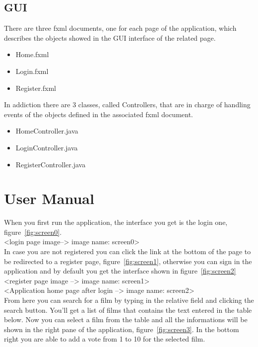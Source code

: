 \documentclass[a4paper, oneside]{article}
\begin{document}
\subsection{GUI}
There are three fxml documents, one for each page of the application, which describes the objects showed in the GUI interface of the related page.
\begin{itemize}
\item Home.fxml
\item Login.fxml
\item Register.fxml
\end{itemize}
In addiction there are 3 classes, called Controllers, that are in charge of handling events of the objects defined in the associated fxml document.
\begin{itemize}
\item HomeController.java
\item LoginController.java
\item RegisterController.java
\end{itemize}

\clearpage
\section{User Manual}
When you first run the application, the interface you get is the login one, figure~\ref{fig:screen0}. \\

<login page image--> image name: screen0>\\

In case you are not registered you can click the link at the bottom of the page to be redirected to a register page, figure~\ref{fig:screen1}, otherwise you can sign in the application and by default you get the interface shown in figure~\ref{fig:screen2}\\

<register page image --> image name: screen1>\\

<Application home page after login --> image name: screen2> \\

From here you can search for a film by typing in the relative field and clicking the search button. You'll get a list of films that contains the text entered in the table below. Now you can select a film from the table and all the informations will be shown in the right pane of the application, figure~\ref{fig:screen3}. In the bottom right you are able to add a vote from 1 to 10 for the selected film.\\
\end{document}
